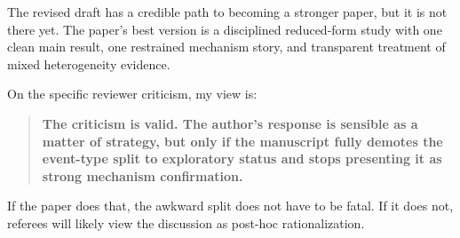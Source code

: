 \documentclass[11pt]{article}
\begin{document}
The revised draft has a credible path to becoming a stronger paper, but it is not there yet. The paper's best version is a disciplined reduced-form study with one clean main result, one restrained mechanism story, and transparent treatment of mixed heterogeneity evidence.

On the specific reviewer criticism, my view is:

\begin{quote}
\textbf{The criticism is valid. The author's response is sensible as a matter of strategy, but only if the manuscript fully demotes the event-type split to exploratory status and stops presenting it as strong mechanism confirmation.}
\end{quote}

If the paper does that, the awkward split does not have to be fatal. If it does not, referees will likely view the discussion as post-hoc rationalization.
\end{document}

